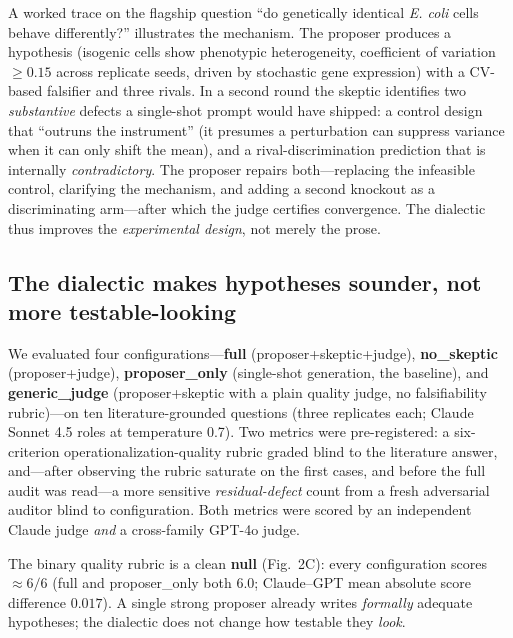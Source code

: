 \documentclass[11pt]{article}
\begin{document}
A worked trace on the flagship question ``do genetically identical \emph{E. coli} cells behave differently?''
illustrates the mechanism. The proposer produces a hypothesis (isogenic cells show phenotypic heterogeneity,
coefficient of variation $\geq 0.15$ across replicate seeds, driven by stochastic gene expression) with a
CV-based falsifier and three rivals. In a second round the skeptic identifies two \emph{substantive} defects a
single-shot prompt would have shipped: a control design that ``outruns the instrument'' (it presumes a
perturbation can suppress variance when it can only shift the mean), and a rival-discrimination prediction that
is internally \emph{contradictory}. The proposer repairs both---replacing the infeasible control, clarifying the
mechanism, and adding a second knockout as a discriminating arm---after which the judge certifies convergence.
The dialectic thus improves the \emph{experimental design}, not merely the prose.

\subsection{The dialectic makes hypotheses sounder, not more testable-looking}
We evaluated four configurations---\textbf{full} (proposer+skeptic+judge), \textbf{no\_skeptic}
(proposer+judge), \textbf{proposer\_only} (single-shot generation, the baseline), and \textbf{generic\_judge}
(proposer+skeptic with a plain quality judge, no falsifiability rubric)---on ten literature-grounded questions
(three replicates each; Claude Sonnet 4.5 roles at temperature 0.7). Two metrics were pre-registered:
a six-criterion operationalization-quality rubric graded blind to the literature answer, and---after observing
the rubric saturate on the first cases, and before the full audit was read---a more sensitive
\emph{residual-defect} count from a fresh adversarial auditor blind to configuration. Both metrics were scored
by an independent Claude judge \emph{and} a cross-family GPT-4o judge.

The binary quality rubric is a clean \textbf{null} (Fig.~2C): every configuration scores $\approx 6/6$ (full and
proposer\_only both $6.0$; Claude--GPT mean absolute score difference $0.017$). A single strong proposer already
writes \emph{formally} adequate hypotheses; the dialectic does not change how testable they \emph{look}.
\end{document}
